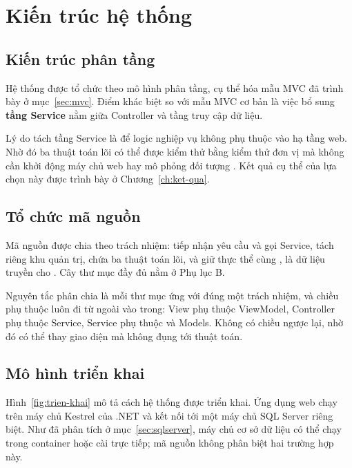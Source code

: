 \section{Kiến trúc hệ thống}
\label{sec:kien-truc}

\subsection{Kiến trúc phân tầng}

Hệ thống được tổ chức theo mô hình phân tầng, cụ thể hóa mẫu MVC đã trình bày ở
mục~\ref{sec:mvc}. Điểm khác biệt so với mẫu MVC cơ bản là việc bổ sung
\textbf{tầng Service} nằm giữa Controller và tầng truy cập dữ liệu.



Lý do tách tầng Service là để logic nghiệp vụ không phụ thuộc vào hạ tầng web.
Nhờ đó ba thuật toán lõi có thể được kiểm thử bằng kiểm thử đơn vị mà không cần
khởi động máy chủ web hay mô phỏng đối tượng . Kết quả cụ thể
của lựa chọn này được trình bày ở Chương~\ref{ch:ket-qua}.

\subsection{Tổ chức mã nguồn}

Mã nguồn được chia theo trách nhiệm:  tiếp nhận yêu cầu và gọi
Service,  tách riêng khu quản trị,  chứa ba
thuật toán lõi,  và  giữ thực thể cùng
,  là dữ liệu truyền cho . Cây
thư mục đầy đủ nằm ở Phụ lục B.

Nguyên tắc phân chia là mỗi thư mục ứng với đúng một trách nhiệm, và chiều phụ
thuộc luôn đi từ ngoài vào trong: View phụ thuộc ViewModel, Controller phụ thuộc
Service, Service phụ thuộc  và Models. Không có chiều ngược
lại, nhờ đó có thể thay giao diện mà không đụng tới thuật toán.

\subsection{Mô hình triển khai}

Hình~\ref{fig:trien-khai} mô tả cách hệ thống được triển khai. Ứng dụng web chạy
trên máy chủ Kestrel của .NET và kết nối tới một máy chủ SQL Server riêng biệt.
Như đã phân tích ở mục~\ref{sec:sqlserver}, máy chủ cơ sở dữ liệu có thể chạy
trong container hoặc cài trực tiếp; mã nguồn không phân biệt hai trường hợp này.

